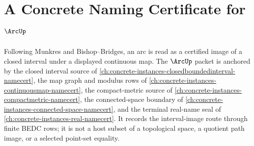 \chapter{A Concrete Naming Certificate for $\ArcUp$}
\label{ch:concrete-instances-arc-namecert}

Following Munkres and Bishop--Bridges, an arc is read as a certified image of a closed interval under a displayed continuous map. The $\ArcUp$ packet is anchored by the closed interval source of \autoref{ch:concrete-instances-closedboundedinterval-namecert}, the map graph and modulus rows of \autoref{ch:concrete-instances-continuousmap-namecert}, the compact-metric source of \autoref{ch:concrete-instances-compactmetric-namecert}, the connected-space boundary of \autoref{ch:concrete-instances-connected-space-namecert}, and the terminal real-name seal of \autoref{ch:concrete-instances-real-namecert}. It records the interval-image route through finite BEDC rows; it is not a host subset of a topological space, a quotient path image, or a selected point-set equality.

